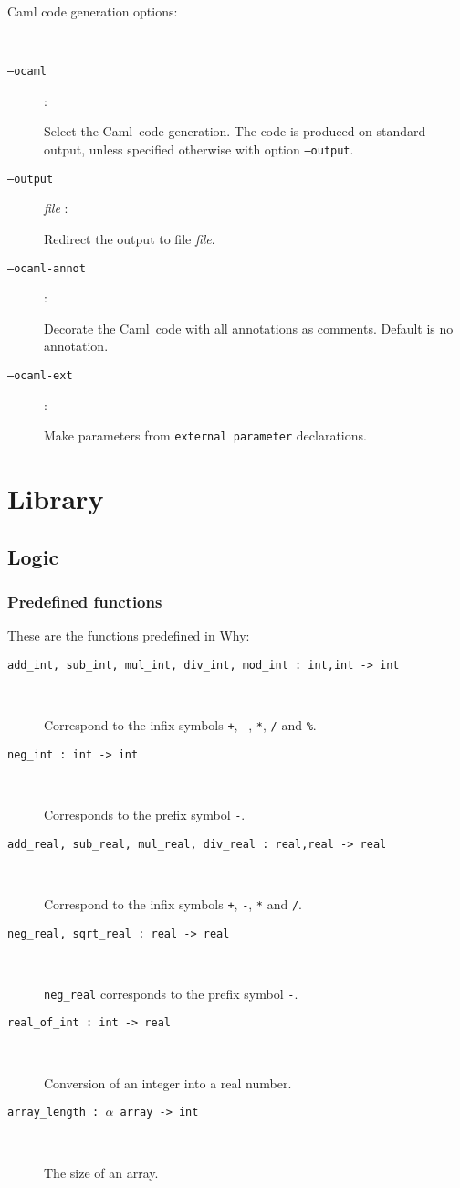 \documentclass[a4paper,12pt]{report}
\newcommand{\caml}{\textsf{Caml}}
\newcommand{\why}{\textsf{Why}}
\begin{document}
\begin{description}
  \item[Caml code generation options:] ~\par
  \item[\texttt{--ocaml}]: ~\par 
    Select the \caml\ code generation. The code is produced on
    standard output, unless specified otherwise with option \texttt{--output}.
  \item[\texttt{--output}] \textit{file} : ~\par 
    Redirect the output to file \textit{file}.
  \item[\texttt{--ocaml-annot}]: ~\par 
    Decorate the \caml\ code with all annotations as comments. Default
    is no annotation.
  \item[\texttt{--ocaml-ext}]: ~\par 
    Make parameters from \texttt{external parameter} declarations.
    
\end{description}


\section{Library}
\label{library}

\subsection{Logic}
\label{lib:logic}

\subsubsection{Predefined functions}

These are the functions predefined in \why:
\begin{description}
\item[\texttt{add\_int, sub\_int, mul\_int, div\_int, mod\_int :
    int,int -> int}] ~\par
  Correspond to the infix symbols
  \texttt{+}, \texttt{-}, \texttt{*}, \texttt{/} and \texttt{\%}.
\item[\texttt{neg\_int : int -> int}] ~\par
  Corresponds to the prefix symbol \texttt{-}.
\item[\texttt{add\_real, sub\_real, mul\_real, div\_real :
    real,real -> real}] ~\par
  Correspond to the infix symbols
  \texttt{+}, \texttt{-}, \texttt{*} and \texttt{/}.
\item[\texttt{neg\_real, sqrt\_real : real -> real}] ~\par
  \texttt{neg\_real} corresponds to the prefix symbol \texttt{-}.
\item[\texttt{real\_of\_int : int -> real}] ~\par
  Conversion of an integer into a real number.
\item[\texttt{array\_length : $\alpha$ array -> int}] ~\par
  The size of an array.
\end{description}
\end{document}
